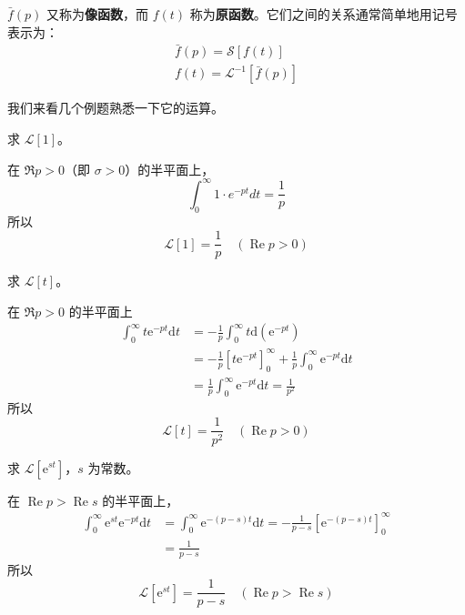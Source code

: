 $\bar f(p)$ 又称为\textbf{像函数}，而 $f(t)$ 称为\textbf{原函数}。它们之间的关系通常简单地用记号表示为：
\begin{equation}
\begin{array}{l}\bar{f}(p)=\mathscr{S}[f(t)] \\ f(t)=\mathscr{L}^{-1}[\bar{f}(p)]\end{array}
\end{equation}

我们来看几个例题熟悉一下它的运算。

\begin{example}{}
求 $\mathscr L[1]$。

在 $\Re p>0$（即 $\sigma>0$）的半平面上，
\begin{equation}
\int_{0}^{\infty} 1 \cdot e^{-p t} d t=\frac{1}{p}
\end{equation}
所以
\begin{equation}
\mathscr{L}[1]=\frac{1}{p} \quad(\operatorname{Re} p>0)
\end{equation}
\end{example}

\begin{example}{}
求 $\mathscr L[t]$。

在 $\Re p>0$ 的半平面上
\begin{equation}
\begin{aligned} \int_{0}^{\infty} t \mathrm{e}^{-p t} \mathrm{d} t &=-\frac{1}{p} \int_{0}^{\infty} t \mathrm{d}\left(\mathrm{e}^{-p t}\right) \\ &=-\frac{1}{p}\left[t \mathrm{e}^{-p t}\right]_{0}^{\infty}+\frac{1}{p} \int_{0}^{\infty} \mathrm{e}^{-p t} \mathrm{d} t \\ &=\frac{1}{p} \int_{0}^{\infty} \mathrm{e}^{-p t} \mathrm{d} t=\frac{1}{p^{2}} \end{aligned}
\end{equation}
所以
\begin{equation}
\mathscr{L}[t]=\frac{1}{p^{2}} \quad(\operatorname{Re} p>0)
\end{equation}
\end{example}

\begin{example}{}
求 $\mathscr L[\mathrm e^{st}]$，$s$ 为常数。

在 $\operatorname{Re} p>\operatorname{Re} s$ 的半平面上，
\begin{equation}
\begin{aligned} \int_{0}^{\infty} \mathrm{e}^{s t} \mathrm{e}^{-p t} \mathrm{d} t &=\int_{0}^{\infty} \mathrm{e}^{-(p-s) t} \mathrm{d} t=-\frac{1}{p-s}\left[\mathrm{e}^{-(p-s) t}\right]_{0}^{\infty} \\ &=\frac{1}{p-s} \end{aligned}
\end{equation}
所以
\begin{equation}
\mathscr{L}\left[\mathrm{e}^{st}\right]=\frac{1}{p-s} \quad(\operatorname{Re} p>\operatorname{Re} s)
\end{equation}
\end{example}

